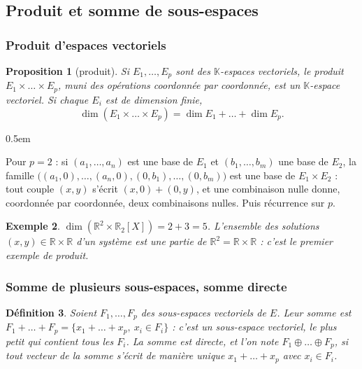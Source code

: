 \documentclass[a4paper,11pt]{article}
\makeatletter
\numberwithin{equation}{section}
\numberwithin{figure}{section}
\numberwithin{table}{section}
\theoremstyle{enonce}
\newtheorem{definition}{Définition}[section]
\newtheorem{proposition}[definition]{Proposition}
\theoremstyle{exemple}
\newtheorem{exemple}[definition]{Exemple}
\theoremstyle{remarque}
\renewcommand{\proofname}{Démonstration}
\renewenvironment{proof}[1][\proofname]{\par\pushQED{\qed}\normalfont
  \topsep0.5em\relax\trivlist\item[\hskip\labelsep\sffamily\itshape\color{Gris}#1.]\ignorespaces}
  {\popQED\endtrivlist\@endpefalse}
\newcounter{exo}[section]
\renewcommand{\theexo}{\thesection.\arabic{exo}}
\newcommand{\K}{\mathbb{K}}
\newcommand{\R}{\mathbb{R}}
\makeatother
\begin{document}
\renewcommand{\thedefinition}{\thesection.\arabic{definition}}\setcounter{definition}{0}
\makeatletter{}\setcounter{tcb@cnt@methode}{0}\makeatother
\renewcommand{\theexo}{\thesection.\arabic{exo}}\setcounter{exo}{0}

\subsection{Produit et somme de sous-espaces}\label{ss:sommes}

\subsubsection*{Produit d'espaces vectoriels}

\begin{proposition}[produit]\label{p:produit}
Si $E_1,\dots,E_p$ sont des $\K$-espaces vectoriels, le produit $E_1\times\dots\times E_p$, muni des opérations coordonnée par
coordonnée, est un $\K$-espace vectoriel. Si chaque $E_i$ est de dimension finie,
\[\dim(E_1\times\dots\times E_p)=\dim E_1+\dots+\dim E_p.\]
\end{proposition}

\begin{proof}
Pour $p=2$ : si $(a_1,\dots,a_n)$ est une base de $E_1$ et $(b_1,\dots,b_m)$ une base de $E_2$, la famille
$\big((a_1,0),\dots,(a_n,0),(0,b_1),\dots,(0,b_m)\big)$ est une base de $E_1\times E_2$ : tout couple $(x,y)$ s'écrit
$(x,0)+(0,y)$, et une combinaison nulle donne, coordonnée par coordonnée, deux combinaisons nulles. Puis récurrence sur $p$.
\end{proof}

\begin{exemple}
$\dim(\R^2\times\R_2[X])=2+3=5$. L'ensemble des solutions $(x,y)\in\R\times\R$ d'un système est une partie de $\R^2=\R\times\R$ :
c'est le premier exemple de produit.
\end{exemple}

\subsubsection*{Somme de plusieurs sous-espaces, somme directe}

\begin{definition}
Soient $F_1,\dots,F_p$ des sous-espaces vectoriels de $E$. Leur \emph{somme} est
$F_1+\dots+F_p=\{x_1+\dots+x_p,\ x_i\in F_i\}$ : c'est un sous-espace vectoriel, le plus petit qui contient tous les $F_i$.
La somme est \emph{directe}, et l'on note $F_1\oplus\dots\oplus F_p$, si tout vecteur de la somme s'écrit de manière
\emph{unique} $x_1+\dots+x_p$ avec $x_i\in F_i$.
\end{definition}
\end{document}
